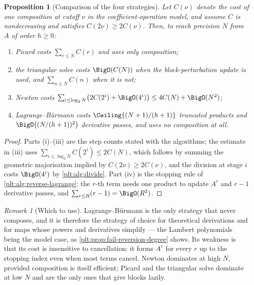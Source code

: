 \documentclass[11pt,oneside]{article}
\theoremstyle{plain}
\newtheorem{proposition}[theorem]{Proposition}
\theoremstyle{definition}
\theoremstyle{remark}
\newtheorem{remark}[theorem]{Remark}
\begin{document}
\begin{proposition}[Comparison of the four strategies]
\label{plt:prop:alg-reversion-comparison}
Let \(C(\nu)\) denote the cost of one composition at cutoff \(\nu\) in the
coefficient-operation model, and assume \(C\) is nondecreasing and satisfies
\(C(2\nu)\ge2C(\nu)\).  Then, to reach precision \(N\) from \(A\) of order
\(h\ge0\):
\begin{enumerate}
\item Picard costs \(\sum_{r\le N}C(r)\) and uses only composition;
\item the triangular solve costs \(\BigO(C(N))\) when the block-perturbation
      update is used, and \(\sum_{n\le N}C(n)\) when it is not;
\item Newton costs \(\sum_{i\le\log_2N}\bigl(2C(2^i)+\BigO(4^i)\bigr)
      \le4C(N)+\BigO(N^2)\);
\item Lagrange--B\"urmann costs
      \(\Ceiling{(N+1)/(h+1)}\) truncated products and
      \(\BigO\bigl((N/(h+1))^2\bigr)\) derivative passes, and uses no
      composition at all.
\end{enumerate}
\end{proposition}

\begin{proof}
Parts (i)--(iii) are the step counts stated with the algorithms; the estimate in
(iii) uses \(\sum_{i\le\log_2N}C(2^i)\le2C(N)\), which follows by summing the
geometric majorisation implied by \(C(2\nu)\ge2C(\nu)\), and the division at
stage \(i\) costs \(\BigO(4^i)\) by \cref{plt:alg:divide}.  Part (iv) is the
stopping rule of \cref{plt:alg:reverse-lagrange}: the \(r\)-th term needs one
product to update \(A^r\) and \(r-1\) derivative passes, and
\(\sum_{r\le R}(r-1)=\BigO(R^2)\).
\end{proof}

\begin{remark}[Which to use]
Lagrange--B\"urmann is the only strategy that never composes, and it is
therefore the strategy of choice for theoretical derivations and for maps whose
powers and derivatives simplify --- the Lambert polynomials being the model
case, as \cref{plt:prop:fail-reversion-degree} shows.  Its weakness is that
its cost is insensitive to cancellation: it forms \(A^r\) for every \(r\) up to
the stopping index even when most terms cancel.  Newton dominates at high
\(N\), provided composition is itself efficient; Picard and the triangular
solve dominate at low \(N\) and are the only ones that give blocks lazily.
\end{remark}
\end{document}
